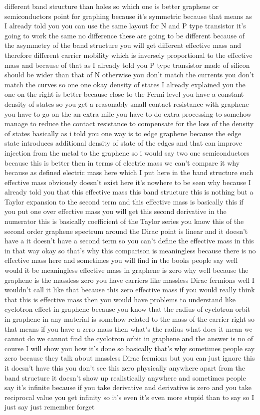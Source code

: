 different band structure than holes so which one is better graphene or semiconductors point for graphing because it's symmetric because that means as I already told you you can use the same layout for N and P type transistor it's going to work the same no difference these are going to be different because of the asymmetry of the band structure you will get different effective mass and therefore different carrier mobility which is inversely proportional to the effective mass and because of that as I already told you P type transistor made of silicon should be wider than that of N otherwise you don't match the currents you don't match the curves so one one okay density of states I already explained you the one on the right is better because close to the Fermi level you have a constant density of states so you get a reasonably small contact resistance with graphene you have to go on the an extra mile you have to do extra processing to somehow manage to reduce the contact resistance to compensate for the loss of the density of states basically as i told you one way is to edge graphene because the edge state introduces additional density of state of the edges and that can improve injection from the metal to the graphene so i would say two one semiconductors because this is better then in terms of electric mass we can't compare it why because as defined electric mass here which I put here in the band structure such effective mass obviously doesn't exist here it's nowhere to be seen why because I already told you that this effective mass this band structure this is nothing but a Taylor expansion to the second term and this effective mass is basically this if you put one over effective mass you will get this second derivative in the numerator this is basically coefficient of the Taylor series you know this of the second order graphene spectrum around the Dirac point is linear and it doesn't have a it doesn't have a second term so you can't define the effective mass in this in that way okay so that's why this comparison is meaningless because there is no effective mass here and sometimes you will find in the books people say well would it be meaningless effective mass in graphene is zero why well because the graphene is the massless zero you have carriers like massless Dirac fermions well I wouldn't call it like that because this zero effective mass if you would really think that this is effective mass then you would have problems to understand like cyclotron effect in graphene because you know that the radius of cyclotron orbit in graphene in any material is somehow related to the mass of the carrier right so that means if you have a zero mass then what's the radius what does it mean we cannot do we cannot find the cyclotron orbit in graphene and the answer is no of course I will show you how it's done so basically that's why sometimes people say zero because they talk about massless Dirac fermions but you can just ignore this it doesn't have this you don't see this zero physically anywhere apart from the band structure it doesn't show up realistically anywhere and sometimes people say it's infinite because if you take derivative and derivative is zero and you take reciprocal value you get infinity so it's even it's even more stupid than to say so I just say just remember forget 